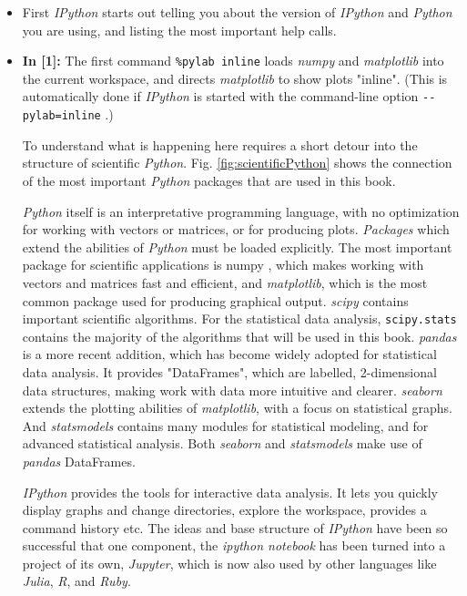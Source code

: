 \begin{itemize}
  \item First \emph{IPython} starts out telling you about the version of \emph{IPython} and \emph{Python} you are using, and listing the most important help calls.

  \item \textbf{In [1]:} The first command \lstinline{%pylab inline} loads \emph{numpy} and \emph{matplotlib} into the current workspace, and directs \emph{matplotlib} to show plots "inline". (This is automatically done if \emph{IPython} is started with the command-line option \lstinline{--pylab=inline} .)

    To understand what is happening here requires a short detour into the structure of scientific \emph{Python}. Fig. \ref{fig:scientificPython} shows the connection of the most important \emph{Python} packages that are used in this book.

    \emph{Python} itself is an interpretative programming language, with no optimization for working with vectors or matrices, or for producing plots. \emph{Packages} which extend the abilities of \emph{Python} must be loaded explicitly. The most important package for scientific applications is \gls{numpy} , which makes working with vectors and matrices fast and efficient, and \emph{matplotlib}, which is the most common package used for producing graphical output. \emph{\gls{scipy}} contains important scientific algorithms. For the statistical data analysis, \texttt{scipy.stats} contains the majority of the algorithms that will be used in this book. \emph{pandas} is a more recent addition, which has become widely adopted for statistical data analysis. It provides "DataFrames", which are labelled, 2-dimensional data structures, making work with data more intuitive and clearer. \emph{seaborn} extends the plotting abilities of \emph{\gls{matplotlib}}, with a focus on statistical graphs. And \emph{statsmodels} contains many modules for statistical modeling, and for advanced statistical analysis. Both \emph{seaborn} and \emph{statsmodels} make use of \emph{pandas} DataFrames.

    \emph{IPython} provides the tools for interactive data analysis. It lets you quickly display graphs and change directories, explore the workspace, provides a command history etc. The ideas and base structure of \emph{IPython} have been so successful that one component, the \emph{ipython notebook} has been turned into a project of its own, \emph{Jupyter}, which is now also used by other languages like \emph{Julia}, \emph{R}, and \emph{Ruby}.


\end{itemize}

